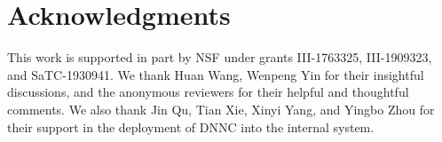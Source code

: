 \documentclass[11pt,a4paper]{article}
\begin{document}






\section*{Acknowledgments}
This work is supported in part by NSF under grants III-1763325, III-1909323, and SaTC-1930941.
We thank Huan Wang, Wenpeng Yin for their insightful discussions, and the anonymous reviewers for their helpful and thoughtful comments.
We also thank Jin Qu, Tian Xie, Xinyi Yang, and Yingbo Zhou for their support in the deployment of DNNC into the internal system.







\end{document}
